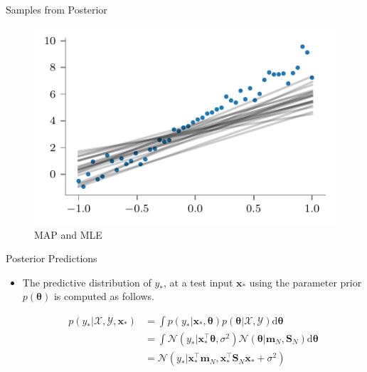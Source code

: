 \documentclass{beamer}
\begin{document}
\begin{frame}{Samples from Posterior}
\begin{figure}
	\centering
	\includegraphics{../../notebooks/bayesian-linear-samples-posterior}
	\caption{MAP and MLE}
	\label{fig:bayesian-linear-dataset}
\end{figure}

\end{frame}


\begin{frame}{Posterior Predictions}
\begin{itemize}[<+->]
\item The predictive distribution of $y_{*}$, at a test input $\boldsymbol{x}_{*}$ using the parameter prior $p(\boldsymbol{\theta})$ is computed as follows.

\begin{equation*}
\begin{aligned}
p\left(y_{*} | \mathcal{X}, \mathcal{Y}, \boldsymbol{x}_{*}\right) &=\int p\left(y_{*} | \boldsymbol{x}_{*}, \boldsymbol{\theta}\right) p(\boldsymbol{\theta} | \mathcal{X}, \mathcal{Y}) \mathrm{d} \boldsymbol{\theta} \\
&=\int \mathcal{N}\left(y_{*} | \boldsymbol{x}_{*}^{\top} \boldsymbol{\theta}, \sigma^{2}\right) \mathcal{N}\left(\boldsymbol{\theta} | \boldsymbol{m}_{N}, \boldsymbol{S}_{N}\right) \mathrm{d} \boldsymbol{\theta} \\
&=\mathcal{N}\left(y_{*} | \boldsymbol{x}_{*}^{\top} \boldsymbol{m}_{N}, \boldsymbol{x}_{*}^{\top} \boldsymbol{S}_{N} \boldsymbol{x}_{*}+\sigma^{2}\right)
\end{aligned}
\end{equation*}

\end{itemize}
\end{frame}
\end{document}
